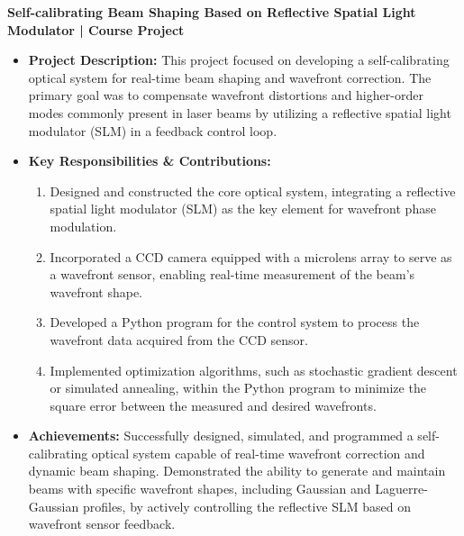 \documentclass[10pt]{article}
\begin{document}
\noindent \textbf{Self-calibrating Beam Shaping Based on Reflective Spatial Light Modulator | Course Project}\vspace{-2pt}
\begin{itemize}
    \item \textbf{Project Description:} This project focused on developing a self-calibrating optical system for real-time beam shaping and wavefront correction. The primary goal was to compensate wavefront distortions and higher-order modes commonly present in laser beams by utilizing a reflective spatial light modulator (SLM) in a feedback control loop.
    \item \textbf{Key Responsibilities \& Contributions:}\vspace{-0.5\baselineskip}
    \begin{enumerate}
        \item Designed and constructed the core optical system, integrating a reflective spatial light modulator (SLM) as the key element for wavefront phase modulation.
        \item Incorporated a CCD camera equipped with a microlens array to serve as a wavefront sensor, enabling real-time measurement of the beam's wavefront shape.
        \item Developed a Python program for the control system to process the wavefront data acquired from the CCD sensor.
        \item Implemented optimization algorithms, such as stochastic gradient descent or simulated annealing, within the Python program to minimize the square error between the measured and desired wavefronts.
    \end{enumerate}
    \vspace{-0.5\baselineskip} %
    \item \textbf{Achievements:} Successfully designed, simulated, and programmed a self-calibrating optical system capable of real-time wavefront correction and dynamic beam shaping. Demonstrated the ability to generate and maintain beams with specific wavefront shapes, including Gaussian and Laguerre-Gaussian profiles, by actively controlling the reflective SLM based on wavefront sensor feedback.
\end{itemize}\vspace{5pt}
\end{document}

